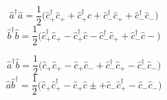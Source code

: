 \begin{equation}
    \hat{a}^{\dagger} \hat{a}=\frac{1}{2}\biggl(\hat{c}_{+}^{\dagger} \hat{c}_{+}+\hat{c}_{+}^{\dagger} \hat{c}+\hat{c}_{-}^{\dagger} \hat{c}_{+}+\hat{c}_{-}^{\dagger} \hat{c}_{-}\biggr)
\end{equation}
\begin{equation}
    \hat{b}^{\dagger} \hat{b}=\frac{1}{2}\biggl(\hat{c}_{+}^{\dagger} \hat{c}_{+}-\hat{c}_{+}^{\dagger} \hat{c}-\hat{c}_{-}^{\dagger} \hat{c}_{+}+\hat{c}_{-}^{\dagger} \hat{c}-\biggr)
\end{equation}

\begin{equation}
    \hat{a}^{\dagger} \hat{b}=\frac{1}{2}\biggl(\hat{c}_{+}\hat{c}_{+}-\hat{c}_{+} \hat{c}_{-}+\hat{c}_{-}^{\dagger} \hat{c}_{+}-\hat{c}_{-}^{\dagger} \hat{c}_{-}\biggr)
\end{equation}
\begin{equation}
    \hat{a} \hat{b}^{\dagger}=\frac{1}{2}\biggl(\hat{c}_{+} \hat{c}_{+}^{\dagger}-\hat{c}_{+} \hat{c} \pm+\hat{c}_{-}\hat{c}_{+}^{\dagger}-\hat{c}_{-}\hat{c}_{-}\biggr)
\end{equation}



